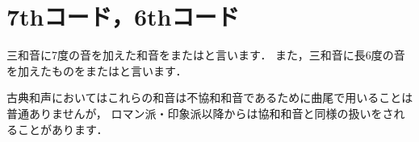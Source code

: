 \documentclass[dvipdfmx,uplatex,b5paper,openany,jbase=12Q,nomag*,textwidth-limit=44%
               ]{gachimuchi}
\begin{document}

\chapter{7thコード，6thコード}
三和音に7度の音を加えた和音をまたは\xkanjispace{}と言います．
また，三和音に長6度の音を加えたものをまたは\xkanjispace{}と言います．


古典和声においてはこれらの和音は不協和和音であるために曲尾で用いることは普通ありませんが，
ロマン派・印象派以降からは協和和音と同様の扱いをされることがあります．
\end{document}
